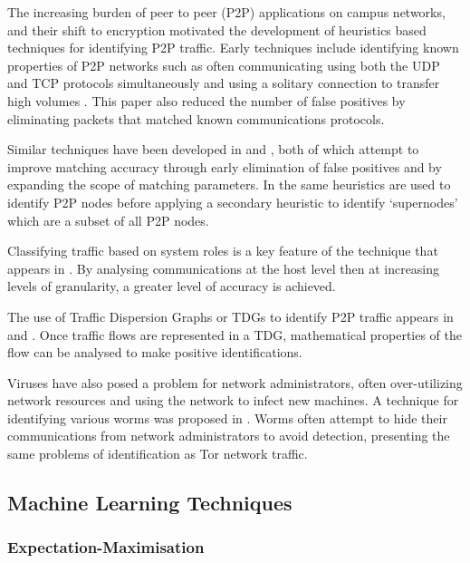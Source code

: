 \documentclass{ecuthesis}
\begin{document}
The increasing burden of peer to peer (P2P) applications on campus networks,
and their shift to encryption motivated the development of heuristics based
techniques for identifying P2P traffic. Early techniques include identifying
known properties of P2P networks such as often communicating using both the UDP
and TCP protocols simultaneously and using a solitary connection to transfer
high volumes \parencite{Karagiannis:2004p6400}. This paper also reduced the
number of false positives by eliminating packets that matched known
communications protocols.

Similar techniques have been developed in \textcite{Perenyi:2006p6325} and
\textcite{John:2008p1376}, both of which attempt to improve matching accuracy
through early elimination of false positives and by expanding the scope of
matching parameters. In \textcite{Oneil:2004p6451} the same heuristics are used
to identify P2P nodes before applying a secondary heuristic to identify
‘supernodes’ which are a subset of all P2P nodes.

Classifying traffic based on system roles is a key feature of the technique
that appears in 
\parencite{Karagiannis:2005p6359}. By analysing communications at the host
level then at increasing levels of granularity, a greater level of accuracy is
achieved.

The use of Traffic Dispersion Graphs or TDGs to identify P2P traffic appears in
\textcite{Iliofotou:2008p6373} and \textcite{Iliofotou:2009p6461}. Once traffic
flows are represented in a TDG, mathematical properties of the flow can be
analysed to make positive identifications.

Viruses have also posed a problem for network administrators, often
over-utilizing network resources and using the network to infect new machines.
A technique for identifying various worms was proposed in
\textcite{Lazarevic:2003p6450}. Worms often attempt to hide their communications
from network administrators to avoid detection, presenting the same problems of
identification as Tor network traffic.

\subsection{Machine Learning Techniques}

\subsubsection{Expectation-Maximisation}
\end{document}
